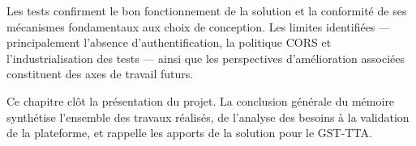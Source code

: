 Les tests confirment le bon fonctionnement de la solution et la conformité de ses mécanismes fondamentaux aux choix de conception. Les limites identifiées — principalement l'absence d'authentification, la politique CORS et l'industrialisation des tests — ainsi que les perspectives d'amélioration associées constituent des axes de travail futurs.

Ce chapitre clôt la présentation du projet. La conclusion générale du mémoire synthétise l'ensemble des travaux réalisés, de l'analyse des besoins à la validation de la plateforme, et rappelle les apports de la solution pour le GST-TTA.
